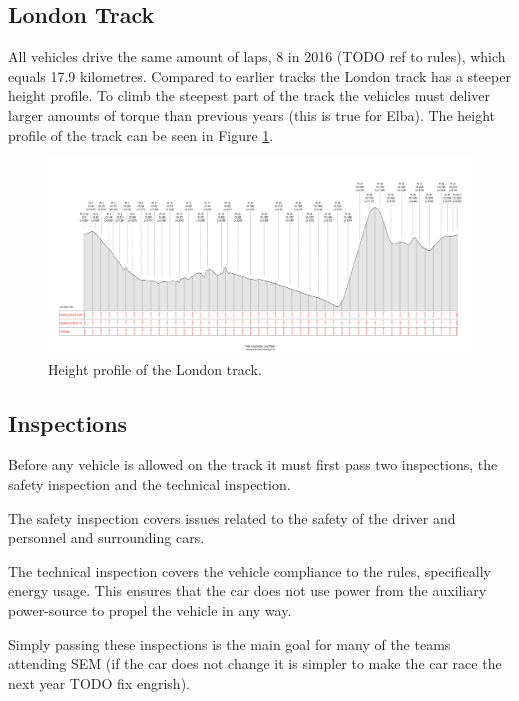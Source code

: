 \subsection{London Track}
All vehicles drive the same amount of laps, 8 in 2016 (TODO ref to rules), which equals 17.9 kilometres. Compared to earlier tracks the London track has a steeper height profile. To climb the steepest part of the track the vehicles must deliver larger amounts of torque than previous years (this is true for Elba). The height profile of the track can be seen in Figure \ref{fig:introduction_londontrack}.

\begin{figure}[H]
    \label{fig:introduction_londontrack}
    \centering
    \includegraphics[width=\textwidth]{./img/introduction_londontrack.png}
    \caption{Height profile of the London track.}
\end{figure}

\subsection{Inspections}
Before any vehicle is allowed on the track it must first pass two inspections, the safety inspection and the technical inspection.

The safety inspection covers issues related to the safety of the driver and personnel and surrounding cars. 

The technical inspection covers the vehicle compliance to the rules, specifically energy usage. This ensures that the car does not use power from the auxiliary power-source to propel the vehicle in any way.

Simply passing these inspections is the main goal for many of the teams attending SEM (if the car does not change it is simpler to make the car race the next year TODO fix engrish).
